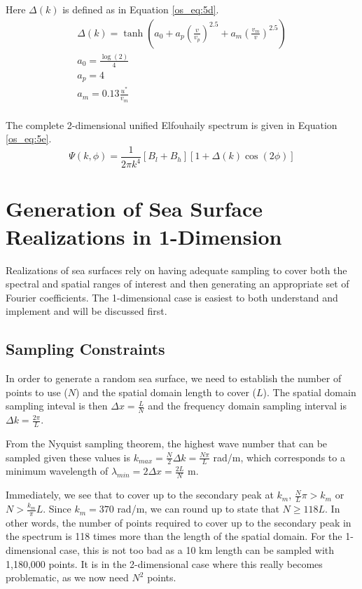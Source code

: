 Here $\Delta(k)$ is defined as in Equation \ref{os_eq:5d}.
\begin{equation}
\label{os_eq:5d}
\begin{gathered}
\Delta(k) = \tanh\left( a_0 + a_p\left(\frac{v}{v_p}\right)^{2.5}  + a_m\left(\frac{v_m}{v} \right)^{2.5}\right)\\
a_0 = \frac{\log(2)}{4} \\
a_p = 4\\
a_m = 0.13\frac{u^*}{v_m} \\
\end{gathered}
\end{equation}
\renewcommand{\baselinestretch}{2} \small\normalsize

The complete 2-dimensional unified Elfouhaily spectrum is given in Equation \ref{os_eq:5e}.
\begin{equation}
\label{os_eq:5e}
\boxed{\Psi(k,\phi) = \frac{1}{2\pi k^4}\left[B_l + B_h \right] \left[1 + \Delta(k)\cos(2\phi) \right]}
\end{equation}

\section{Generation of Sea Surface Realizations in 1-Dimension}\label{os_sec:1d}
Realizations of sea surfaces rely on having adequate sampling to cover both the spectral and spatial ranges of interest and then generating an appropriate set of Fourier coefficients. The 1-dimensional case is easiest to both understand and implement and will be discussed first.

\subsection{Sampling Constraints}\label{os_label:1d_sampling_constraints}
In order to generate a random sea surface, we need to establish the number of points to use ($N$) and the spatial domain length to cover ($L$). The spatial domain sampling inteval is then $\Delta x = \frac{L}{N}$ and the frequency domain sampling interval is $\Delta k = \frac{2\pi}{L}$. 

From the Nyquist sampling theorem, the highest wave number that can be sampled given these values is $k_{max} = \frac{N}{2}\Delta k = \frac{N\pi}{L}$ rad/m, which corresponds to a minimum wavelength of $\lambda_{min} = 2\Delta x = \frac{2L}{N}$ m.

Immediately, we see that to cover up to the secondary peak at $k_m$, $\frac{N}{L}\pi > k_m$ or $N > \frac{k_m}{\pi}L$. Since $k_m = 370$ rad/m, we can round up to state that $N \geq 118L$. In other words, the number of points required to cover up to the secondary peak in the spectrum is 118 times more than the length of the spatial domain. For the 1-dimensional case, this is not too bad as a 10 km length can be sampled with 1,180,000 points. It is in the 2-dimensional case where this really becomes problematic, as we now need $N^2$ points.


